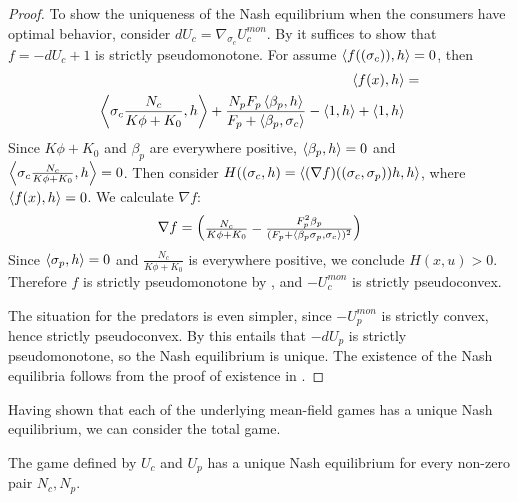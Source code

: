\begin{proof}
  To show the uniqueness of the Nash equilibrium when the consumers have optimal behavior, consider $dU_c = \nabla_{\sigma_c} U_c^{mon}$.  By  it suffices to show that $f = -dU_c + 1$ is strictly pseudomonotone.
  For  assume $\left \langle f((\sigma_c)),h \right \rangle = 0$, then
  \begin{equation}
    \begin{split}
      \ip{f(x)}{h} &= \\
      \ip{\sigma_c \frac{N_c}{K\phi + K_0} }{h} + \frac{N_p F_p \ip{\beta_p }{h}}{F_p + \ip{\beta_p}{\sigma_c}} - \ip{1}{h} + \ip{1}{h}
    \end{split}
  \end{equation}
  Since $K\phi + K_0$ and $\beta_p$ are everywhere positive, $\left \langle \beta_p,h \right \rangle = 0$ and $\ip{\sigma_c \frac{N_c}{K\phi + K_0}}{h} = 0$. Then consider $H((\sigma_c,h)= \left \langle (\nabla f)((\sigma_c,\sigma_p))h,h \right \rangle$, where $\left \langle f(x),h \right \rangle = 0$. We calculate $\nabla f$:
    \begin{equation}
      \nabla f = \begin{pmatrix} \frac{N_c}{K \phi + K_0} - \frac{F_p^2\beta_p}{(F_p + \ip{\beta_p \sigma_p}{\sigma_c})^2} \\
    \end{pmatrix}
    \end{equation}
    Since $\left \langle \sigma_p,h \right \rangle=0$ and $\frac{N_c}{K\phi + K_0}$ is everywhere positive, we conclude $H(x,u)>0$. Therefore $f$ is strictly pseudomonotone by , and $-U_c^{mon}$ is strictly pseudoconvex.

    The situation for the predators is even simpler, since $-U_p^{mon}$ is strictly convex, hence strictly pseudoconvex. By  this entails that $-dU_p$ is strictly pseudomonotone, so the Nash equilibrium is unique.
    The existence of the Nash equilibria follows from the proof of existence in .
\end{proof}
Having shown that each of the underlying mean-field games has a unique Nash equilibrium, we can consider the total game.
\begin{proposition}
  \label{prop:exist_unique_nash}
  The game defined by $U_c$ and $U_p$ has a unique Nash equilibrium for every non-zero pair $N_c,N_p$.
\end{proposition}
